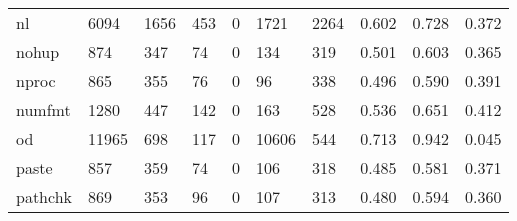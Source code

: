 \begin{longtable}{lp{1.3cm}p{1.3cm}p{1.3cm}p{1.3cm}p{1.3cm}p{1.3cm}p{1.3cm}p{1.3cm}p{1.3cm}}
nl        &                   6094 &                               1656 &                               453 &                                0 &                              1721 &                            2264 &                                   0.602 &                                  0.728 &                                0.372 \\
nohup     &                    874 &                                347 &                                74 &                                0 &                               134 &                             319 &                                   0.501 &                                  0.603 &                                0.365 \\
nproc     &                    865 &                                355 &                                76 &                                0 &                                96 &                             338 &                                   0.496 &                                  0.590 &                                0.391 \\
numfmt    &                   1280 &                                447 &                               142 &                                0 &                               163 &                             528 &                                   0.536 &                                  0.651 &                                0.412 \\
od        &                  11965 &                                698 &                               117 &                                0 &                             10606 &                             544 &                                   0.713 &                                  0.942 &                                0.045 \\
paste     &                    857 &                                359 &                                74 &                                0 &                               106 &                             318 &                                   0.485 &                                  0.581 &                                0.371 \\
pathchk   &                    869 &                                353 &                                96 &                                0 &                               107 &                             313 &                                   0.480 &                                  0.594 &                                0.360 \\

\end{longtable}
